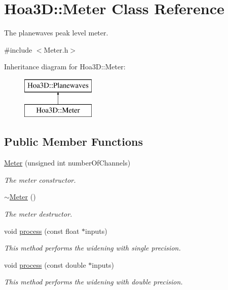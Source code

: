 \hypertarget{class_hoa3_d_1_1_meter}{\section{Hoa3\-D\-:\-:Meter Class Reference}
\label{class_hoa3_d_1_1_meter}
}


The planewaves peak level meter.  




{\ttfamily \#include $<$Meter.\-h$>$}

Inheritance diagram for Hoa3\-D\-:\-:Meter\-:\begin{figure}[H]
\begin{center}
\leavevmode
\includegraphics[height=2.000000cm]{class_hoa3_d_1_1_meter}
\end{center}
\end{figure}
\subsection*{Public Member Functions}
\begin{DoxyCompactItemize}
\item 
\hyperlink{class_hoa3_d_1_1_meter_a8dbe4a3655161c329540557cfed8c52a}{Meter} (unsigned int number\-Of\-Channels)
\begin{DoxyCompactList}\small\item\em The meter constructor. \end{DoxyCompactList}\item 
\hyperlink{class_hoa3_d_1_1_meter_a2f4d18e0007e96c1cd60e2f17d9575cc}{$\sim$\-Meter} ()
\begin{DoxyCompactList}\small\item\em The meter destructor. \end{DoxyCompactList}\item 
void \hyperlink{class_hoa3_d_1_1_meter_a85c538e8cf9791674a9ac6e602463dd0}{process} (const float $\ast$inputs)
\begin{DoxyCompactList}\small\item\em This method performs the widening with single precision. \end{DoxyCompactList}\item 
void \hyperlink{class_hoa3_d_1_1_meter_a273685843e1059b74b6d386dfb19c53b}{process} (const double $\ast$inputs)
\begin{DoxyCompactList}\small\item\em This method performs the widening with double precision. \end{DoxyCompactList}\end{DoxyCompactItemize}


